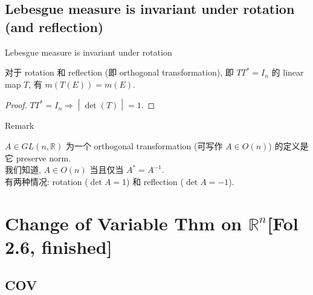 \documentclass{qlnotes-export}
\begin{document}
\subsection{Lebesgue measure is invariant under rotation (and reflection)}\label{lebesgue-measure-is-invariant-under-rotation-and-reflection}

\begin{corollary}{Lebesgue measure is invariant under rotation}\label{cor-07-lebesgue-measure-on-r-n-lebesgue-measure-is-invariant-under-rotation}

对于 rotation 和 reflection (即 orthogonal transformation), 即 \(TT^{\ast} = I_{n}\) 的 linear map \(T\), 有 \(m(T(E)) = m(E)\).

\end{corollary}

\begin{proof}

\(\left. TT^{\ast} = I_{n}\Longrightarrow \middle| \det(T) \middle| = 1 \right.\).

\end{proof}

\begin{qlremark}{Remark}

\(A \in GL(n,{\mathbb{R}})\) 为一个 orthogonal transformation (可写作 \(A \in O(n)\)) 的定义是它 preserve norm.\\
我们知道, \(A \in O(n)\) 当且仅当 \(A^{\ast} = A^{- 1}\).\\
有两种情况: rotation (\(\det A = 1\)) 和 reflection (\(\det A = - 1\)).\\

\end{qlremark}

\section{\texorpdfstring{Change of Variable Thm on \({\mathbb{R}}^{n}\){[}Fol 2.6, finished{]}}{Change of Variable Thm on \{\textbackslash mathbb\{R\}\}\^{}\{n\}{[}Fol 2.6, finished{]}}}

\subsection{COV}\label{cov}
\end{document}
